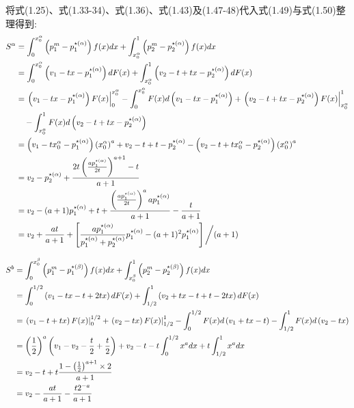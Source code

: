 将式(1.25)、式(1.33-34)、式(1.36)、式(1.43)及(1.47-48)代入式(1.49)与式(1.50)整理得到:
\begin{align}
S^\alpha &=\int_0^{x_0^\alpha}\left(p_1^m-p_1^{\star(\alpha)}\right) f(x) d x+\int_{x_0^\alpha}^1\left(p_2^m-p_2^{\star(\alpha)}\right) f(x) d x \notag\\
&=\int_0^{x_0^\alpha}\left(v_1-t x-p_1^{\star(\alpha)}\right) d F(x)+\int_{x_0^\alpha}^1\left(v_2-t+t x-p_2^{\star(\alpha)}\right) d F(x) \notag\\
&=\left.\left(v_1-t x-p_1^{\star(\alpha)}\right) F(x)\right|_0 ^{x_0^\alpha}-\int_0^{x_0^\alpha} F(x) d\left(v_1-t x-p_1^{\star(\alpha)}\right)+\left.\left(v_2-t+t x-p_2^{\star(\alpha)}\right) F(x)\right|_{x_0^\alpha} ^1 \notag\\
& \quad-\int_{ x_0^\alpha}^1 F(x) d\left(v_2-t+t x-p_2^{\star(\alpha)}\right)\notag \\
&=\left(v_1-t x_0^\alpha-p_1^{\star(\alpha)}\right)\left(x_0^\alpha\right)^a+v_2-t+t-p_2^{\star(\alpha)}-\left(v_2-t+t x_0^\alpha-p_2^{\star(\alpha)}\right)\left(x_0^{\alpha}\right)^a\notag \\
&=v_2-p_2^{\star (\alpha)}+\frac{2 t\left(\frac{a p_1^{\star(\alpha)}}{2 t}\right)^{a+1}-t}{a+1} \notag \\
&=v_2-(a+1) p_1^{\star(\alpha)}+t+\frac{\left(\frac{a p_1^{\star(\alpha)}}{2 t}\right)^a a p_1^{\star(\alpha)}}{a+1}-\frac{t}{a+1} \notag \\
&=v_2+\frac{a t}{a+1}+\left[\frac{a p_1^{\star(\alpha)}}{p_1^{\star(\alpha)}+p_2^{\star(\alpha)}} p_1^{\star(\alpha)}-(a+1)^2 p_1^{\star(\alpha)}\right] \bigg/(a+1)
\end{align}

\begin{align}
 S^b&=\int_0^{x_0^\beta}\left(p_1^m-p_1^{\star(\beta)}\right) f(x) d x+\int_{x_0^\beta}^1\left(p_2^m-p_2^{\star(\beta)}\right) f(x) d x \notag\\
&=\int_0^{1 / 2}\left(v_1-t x-t+2tx\right) d F(x)+\int_{1 / 2}^1\left(v_2+t x-t+t-2 t x\right) d F(x) \notag\\
&=\left.\left(v_1-t+t x\right) F(x)\right|_0 ^{1 / 2}+\left.\left(v_2-t x\right) F(x)\right|_{1 / 2} ^1-\int_0^{1 / 2} F(x) d\left(v_1+t x-t\right)-\int_{1 / 2}^1 F(x) d\left(v_2-t x\right) \notag\\
&=\left(\frac{1}{2}\right)^a\left(v_1-v_2-\frac{t}{2}+\frac{t}{2}\right)+v_2-t-t \int_0^{1 / 2} x^a d x+t \int_{1 / 2}^1 x^a d x \notag\\
&=v_2-t+t \frac{1-\left(\frac{1}{2}\right)^{a+1} \times 2}{a+1}\notag\\
&=v_2-\frac{a t}{a+1}-\frac{t2^{-a}}{a+1} 
\end{align}

